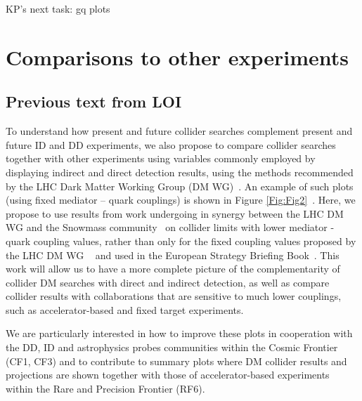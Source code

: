 \documentclass[11pt]{article}
\begin{document}
{\color{red}KP's next task: gq plots}

\section{Comparisons to other experiments}

\subsection{Previous text from LOI}

To understand how present and future collider searches complement present and future ID and DD experiments, we also propose to compare collider searches together with other experiments using variables commonly employed by displaying indirect and direct detection results, using the methods recommended by the LHC Dark Matter Working Group (DM WG)~\cite{BOVEIA2020100365,ALBERT2019100377}. An example of such plots (using fixed mediator – quark couplings) is shown in Figure \ref{Fig:Fig2}~\cite{Ellis:2691414}. Here, we propose to use results from work undergoing in synergy between the LHC DM WG and the Snowmass community~\cite{LOIVaryingCouplings} on collider limits with lower mediator - quark coupling values, rather than only for the fixed coupling values proposed by the LHC DM WG ~\cite{BOVEIA2020100365,ALBERT2019100377} and used in the European Strategy Briefing Book~\cite{Ellis:2691414}. This work will allow us to have a more complete picture of the complementarity of collider DM searches with direct and indirect detection, as well as compare collider results with collaborations that are sensitive to much lower couplings, such as accelerator-based and fixed target experiments. 

We are particularly interested in how to improve these plots in cooperation with the DD, ID and astrophysics probes communities within the Cosmic Frontier (CF1, CF3) and to contribute to summary plots where DM collider results and projections are shown together with those of accelerator-based experiments within the Rare and Precision Frontier (RF6). 

\end{document}
